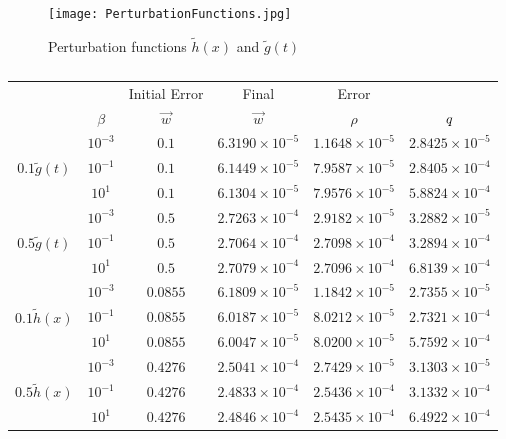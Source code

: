 \begin{figure}[h]
	\texttt{[image: PerturbationFunctions.jpg]}
	\caption{Perturbation functions $\tilde h(x)$ and  $\tilde g(t)$}
	\label{Fig:PerturbationFunctions}
\end{figure} 
\begin{table}
	\begin{tabular}{ ||c |c || c || c |c | c ||}
		\hline
		                    &	& Initial Error  & Final & Error &  \\ 
		                	& $\beta$  & $\vec{w}$  & $\vec{w}$  & $\rho$ & $q$ \\ 
		\hline
			                & $10^{-3}$	& $0.1$  & $6.3190 \times 10^{-5}$ & $1.1648 \times 10^{-5}$ & $2.8425 \times 10^{-5}$  \\
		 $0.1\tilde g(t)$   & $10^{-1}$	& $0.1$  & $6.1449 \times 10^{-5}$ & $7.9587 \times 10^{-5}$ & $2.8405 \times 10^{-4}$ \\
		                 	& $10^{1}$	& $0.1$  & $6.1304 \times 10^{-5}$ & $7.9576 \times 10^{-5}$ & $5.8824 \times 10^{-4}$ \\
		\hline 
			                & $10^{-3}$	& $0.5$  & $2.7263 \times 10^{-4}$  & $2.9182 \times 10^{-5}$ & $3.2882 \times 10^{-5}$ \\
		$0.5 \tilde g(t)$   & $10^{-1}$	& $0.5$  & $2.7064 \times 10^{-4}$ & $2.7098 \times 10^{-4}$ &  $3.2894 \times 10^{-4}$\\
		                    & $10^{1}$	& $0.5$  & $2.7079 \times 10^{-4}$ & $2.7096 \times 10^{-4}$ & $6.8139 \times 10^{-4}$ \\
		\hline 
			                & $10^{-3}$	& $0.0855$ & $6.1809 \times 10^{-5}$ & $1.1842 \times 10^{-5}$ & $2.7355 \times 10^{-5}$ \\
		$0.1\tilde h(x)$    & $10^{-1}$	& $0.0855$ & $6.0187 \times 10^{-5}$ & $8.0212 \times 10^{-5}$ & $2.7321 \times 10^{-4}$ \\
		                    & $10^{1}$	& $0.0855$ & $6.0047 \times 10^{-5}$ & $8.0200 \times 10^{-5}$ & $5.7592 \times 10^{-4}$ \\
		\hline 
			                & $10^{-3}$	& $0.4276$  & $2.5041 \times 10^{-4}$ & $2.7429 \times 10^{-5}$ & $3.1303 \times 10^{-5}$ \\
		$0.5\tilde h(x)$    & $10^{-1}$	& $0.4276$  & $2.4833 \times 10^{-4}$ & $2.5436 \times 10^{-4}$ & $3.1332 \times 10^{-4}$ \\
	                     	& $10^{1}$	& $0.4276$  & $2.4846 \times 10^{-4}$ & $2.5435 \times 10^{-4}$ & $6.4922 \times 10^{-4}$ \\
		\hline 
    \end{tabular}
	\caption{}
\label{TabApp2}
\end{table}

